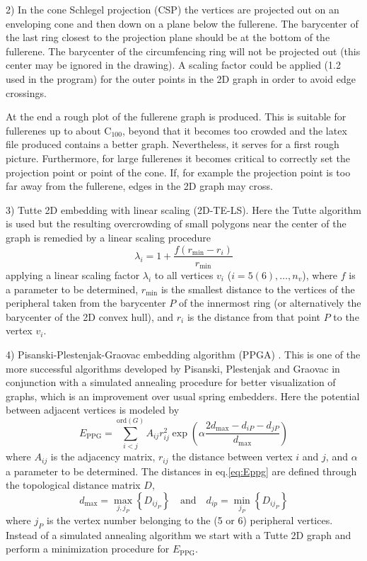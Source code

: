 \documentclass[article,a4paper,twoside]{memoir}
\newcommand{\C}[1]{\ensuremath{\mathrm{C}_{#1}}}
\begin{document}
2) In the cone Schlegel projection (CSP) the vertices are projected out on an enveloping cone and then down on a plane below the fullerene. 
The barycenter of the last ring closest to the projection plane should be at the bottom of the fullerene. The barycenter of the circumfencing
ring will not be projected out (this center may be ignored in the drawing). A scaling factor could be applied (1.2 used in the program)
for the outer points in the 2D graph in order to avoid edge crossings.
       
At the end a rough plot of the fullerene graph is produced. This is suitable for fullerenes up to about \C{100}, beyond that
it becomes too crowded and the latex file produced contains a better graph. Nevertheless, it serves for a first rough picture. 
Furthermore, for large fullerenes it becomes critical to correctly set the projection point or point of the cone.
If, for example the projection point is too far away from the fullerene, edges in the 2D graph may cross.

3) Tutte 2D embedding with linear scaling (2D-TE-LS). Here the Tutte algorithm is used \cite{Tutte}
but the resulting overcrowding of small polygons near the center of the graph is remedied
by a linear scaling procedure
\begin{equation}
	\label{GrindEQ__16_} 
	\lambda_i = 1+\frac{f(r_\mathrm{min} - r_i)}{r_\mathrm{min}}
\end{equation}
applying a linear scaling factor $\lambda_i$ to all vertices $v_i$ ($i=5(6),\dots , n_v$), where $f$
is a parameter to be determined, $r_{\mathrm{min}}$ is the smallest distance to the vertices of the peripheral
taken from the barycenter $P$ of the innermost ring (or alternatively the barycenter of the 2D convex hull), 
and $r_i$ is the distance from that point $P$ to the vertex $v_i$.

4) Pisanski-Plestenjak-Graovac embedding algorithm (PPGA) \cite{pisanski95}. This is one of the more successful algorithms developed by 
Pisanski, Plestenjak and Graovac in conjunction with a simulated annealing procedure for better visualization of graphs, 
which is an improvement over usual spring embedders. Here the potential between adjacent vertices is modeled by
\begin{equation} 
\label{eq:Eppg} 
E_{\mathrm{PPG}} =\sum_{i<j}^{\mathrm{ord}(G)} A_{ij}  r_{ij}^{2} \exp \left(\alpha \frac{2d_{\mathrm{max}} -d_{iP} -d_{jP} }{d_{\mathrm{max}} } \right) 
\end{equation} 
where $A_{ij}$ is the adjacency matrix, $r_{ij}$ the distance between vertex $i$ and $j$, and $\alpha$ a
parameter to be determined. The distances in eq.\eqref{eq:Eppg} are defined through the topological
distance matrix $D$,
\begin{equation}
	\label{GrindEQ__20_}
  	d_{\mathrm{max}} = \max_{j,j_P}\left\{ D_{ij_P} \right\}\quad\text{and}\quad d_{ip} = \min_{j_P}\left\{ D_{ij_P} \right\}
\end{equation}
where  $j_P$ is the vertex number belonging to the (5 or 6) peripheral vertices.  Instead of a
simulated annealing algorithm we start with a Tutte 2D graph and perform a minimization procedure for $E_{\mathrm{PPG}}$.
\end{document}
